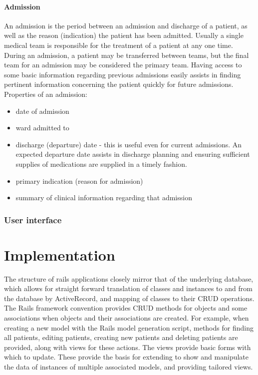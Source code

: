 \documentclass[letterpaper]{amsart}
\begin{document}
\subsection{Admission} An admission is the period between an admission and discharge of a patient, as well as the reason (indication) the patient has been admitted.  Usually a single medical team is responsible for the treatment of a patient at any one time.  During an admission, a patient may be transferred between teams, but the final team for an admission may be considered the primary team.  Having access to some basic information regarding previous admissions easily assists in finding pertinent information concerning the patient quickly for future admissions.   
Properties of an admission:\\
\begin{itemize}
    \item date of admission 
    \item ward admitted to 
    \item discharge (departure) date - this is useful even for current admissions.  An expected departure date assists in discharge planning and ensuring sufficient supplies of medications are supplied in a timely fashion. 
    \item primary indication (reason for admission) 
    \item summary of clinical information regarding that admission 
\end{itemize}


\section{User interface}
\part{Implementation}
The structure of rails applications closely mirror that of the underlying database, which allows for straight forward translation of classes and instances to and from the database by ActiveRecord, and mapping of classes to their CRUD operations.
The Rails framework convention provides CRUD methods for objects and some associations when objects and their associations are created.  For example, when creating a new model with the Rails model generation script, methods for finding all patients, editing patients, creating new patients and deleting patients are provided, along with views for these actions.  The views provide basic forms with which to update.  These provide the basis for extending to show and manipulate the data of instances of multiple associated models, and providing tailored views. 
\end{document}
